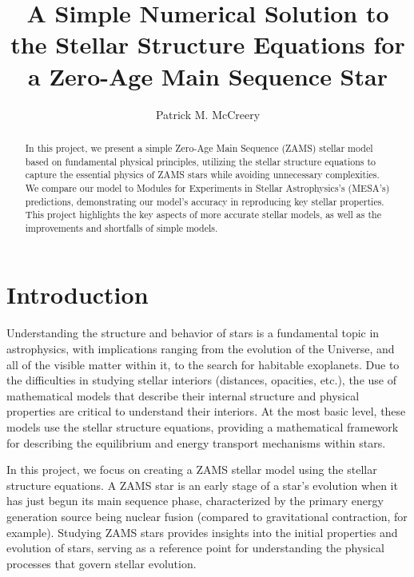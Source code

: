 \documentclass[twocolumn]{aastex631}
\begin{document}
\title{A Simple Numerical Solution to the Stellar Structure Equations for a Zero-Age Main Sequence Star}

\author{Patrick M. McCreery}


\begin{abstract}

In this project, we present a simple Zero-Age Main Sequence (ZAMS) stellar model based on fundamental physical principles, utilizing the stellar structure equations to capture the essential physics of ZAMS stars while avoiding unnecessary complexities. We compare our model to Modules for Experiments in Stellar Astrophysics's (MESA's) predictions, demonstrating our model's accuracy in reproducing key stellar properties. This project highlights the key aspects of more accurate stellar models, as well as the improvements and shortfalls of simple models.

\end{abstract}


\section{Introduction} \label{sec:intro}

Understanding the structure and behavior of stars is a fundamental topic in astrophysics, with implications ranging from the evolution of the Universe, and all of the visible matter within it, to the search for habitable exoplanets. Due to the difficulties in studying stellar interiors (distances, opacities, etc.), the use of mathematical models that describe their internal structure and physical properties are critical to understand their interiors. At the most basic level, these models use the stellar structure equations, providing a mathematical framework for describing the equilibrium and energy transport mechanisms within stars. 

In this project, we focus on creating a ZAMS stellar model using the stellar structure equations. A ZAMS star is an early stage of a star's evolution when it has just begun its main sequence phase, characterized by the primary energy generation source being nuclear fusion (compared to gravitational contraction, for example). Studying ZAMS stars provides insights into the initial properties and evolution of stars, serving as a reference point for understanding the physical processes that govern stellar evolution.
\end{document}
